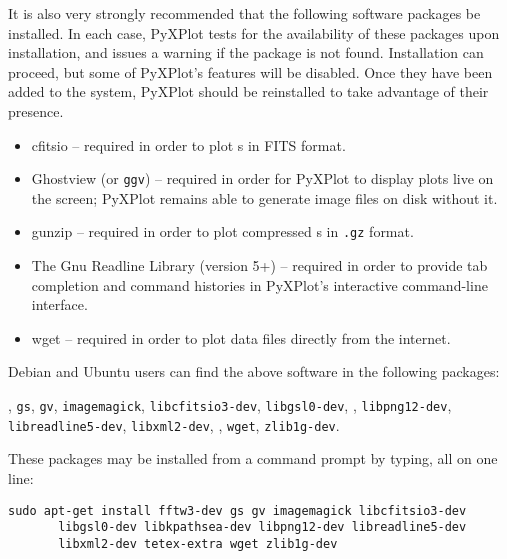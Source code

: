 \noindent It is also very strongly recommended that the following software
packages be installed. In each case, PyXPlot tests for the availability of
these packages upon installation, and issues a warning if the package is not
found. Installation can proceed, but some of PyXPlot's features will be
disabled. Once they have been added to the system, PyXPlot should be
reinstalled to take advantage of their presence.

\vspace{0.5cm}
\begin{itemize}
\item cfitsio -- required in order to plot \datafile s in FITS format.
\item Ghostview (or {\tt ggv})  -- required in order for PyXPlot to display plots live on the screen; PyXPlot remains able to generate image files on disk without it.
\item gunzip  -- required in order to plot compressed \datafile s in {\tt .gz} format.
\item The Gnu Readline Library (version 5+)  -- required in order to provide tab completion and command histories in PyXPlot's interactive command-line interface.
\item wget  -- required in order to plot data files directly from the internet.
\end{itemize}
\vspace{0.5cm}

Debian and Ubuntu users can find the above software in the following packages:

\vspace{2mm}
, {\tt gs}, {\tt gv}, {\tt imagemagick}, {\tt libcfitsio3-dev}, {\tt libgsl0-dev},\newline
{}, {\tt libpng12-dev}, {\tt libreadline5-dev}, {\tt libxml2-dev},\newline
{}, {\tt wget}, {\tt zlib1g-dev}.
\vspace{2mm}

\noindent These packages may be installed from a command prompt by typing, all on one line:

\begin{verbatim}
sudo apt-get install fftw3-dev gs gv imagemagick libcfitsio3-dev
       libgsl0-dev libkpathsea-dev libpng12-dev libreadline5-dev
       libxml2-dev tetex-extra wget zlib1g-dev
\end{verbatim}

